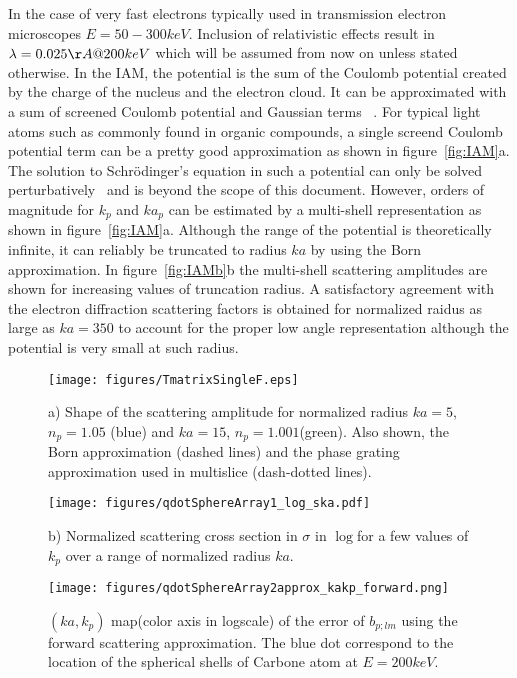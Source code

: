 In the case of very fast electrons typically used in transmission electron
microscopes $E=50-300keV$. Inclusion of relativistic effects result in
$\lambda=0.025\AA@200keV$ which will be assumed from now on unless stated
otherwise.
In the IAM, the potential is the sum of the Coulomb potential created
by the charge of the nucleus and the electron cloud. It can be approximated
with a sum of screened Coulomb potential and Gaussian terms ~\cite{Kirkland2019}.
For typical light atoms such as commonly found in organic compounds, a single
screend Coulomb potential term can be a pretty good approximation as shown in
figure~\ref{fig:IAM}a. The solution to Schr{\"o}dinger's equation in such a
potential can only be solved perturbatively~\cite{Muller1965} and is beyond the
scope of this document. However, orders of magnitude for $k_p$ and $ka_p$
can be estimated by a multi-shell representation as shown in figure~\ref{fig:IAM}a.
Although the range of the potential is theoretically infinite, it can
reliably be truncated to radius $ka$ by using the Born approximation.
In figure~\ref{fig:IAMb}b the multi-shell scattering amplitudes are shown for
increasing values of truncation radius. A satisfactory agreement with the
electron diffraction scattering factors is obtained for normalized raidus
as large as $ka=350$ to account for the proper low angle representation
although the potential is very small at such radius.

\begin{figure}
    \texttt{[image: figures/TmatrixSingleF.eps]}
\caption{
a) Shape of the scattering amplitude for
normalized radius $ka=5$, $n_p=1.05$ (blue)
and $ka=15$, $n_p=1.001$(green).
Also shown, the Born approximation (dashed lines) and
the phase grating approximation used in multislice (dash-dotted lines).
}\label{fig:TmatrixSingleF}
\end{figure}
%

\begin{figure}
  \texttt{[image: figures/qdotSphereArray1\_log\_ska.pdf]}
  \caption{
b) Normalized scattering cross section in $\sigma$ in $\log$for a few values
of $k_p$ over a range of normalized radius $ka$.
}\label{fig:TmatrixSingleScat}
\end{figure}

\begin{figure}
  \centering
    \texttt{[image: figures/qdotSphereArray2approx\_kakp\_forward.png]}
  \caption{$(ka,k_p)$ map(color axis in logscale) of the error of $b_{p;lm}$
using the forward scattering approximation.
The blue dot correspond to the location of the spherical shells of Carbone
atom at $E=200keV$.}\label{fig:TmatrixApproxForward}
\end{figure}

